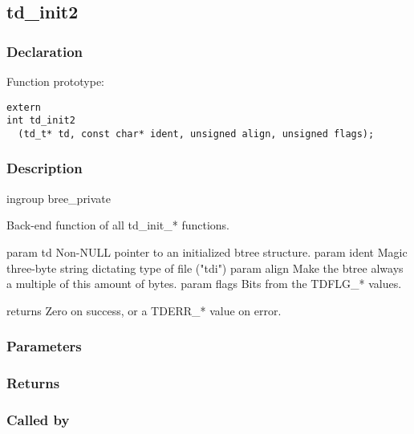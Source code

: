 
\newpage
\subsection{td\_init2}
\subsubsection{Declaration} Function prototype:

\begin{verbatim}
extern
int td_init2
  (td_t* td, const char* ident, unsigned align, unsigned flags);
\end{verbatim}

\subsubsection{Description}


 ingroup bree\_private

 Back-end function of all td\_init\_* functions.
 
 param td Non-NULL pointer to an initialized btree structure.
 param ident Magic three-byte string dictating type of file ("tdi")
 param align Make the btree always a multiple of this amount of bytes.
 param flags Bits from the TDFLG\_* values.

 returns Zero on success, or a TDERR\_* value on error.
 

\subsubsection{Parameters}
\subsubsection{Returns}
\subsubsection{Called by}

